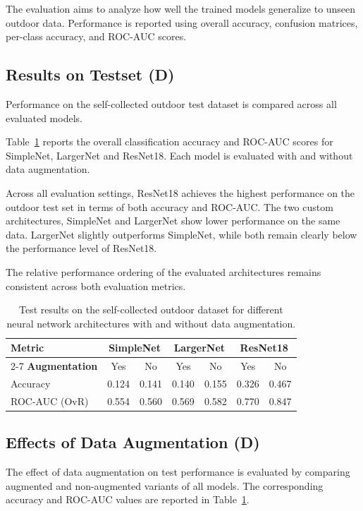 \documentclass[a4paper]{article}
\begin{document}
The evaluation aims to analyze how well the trained models generalize to unseen outdoor data. Performance is reported using overall accuracy, confusion matrices, per-class accuracy, and ROC-AUC scores.

\subsection{Results on Testset (D)}
Performance on the self-collected outdoor test dataset is compared across all evaluated models. 

Table~\ref{tab:test_results} reports the overall classification accuracy and ROC-AUC scores for SimpleNet, LargerNet and ResNet18. Each model is evaluated with and without data augmentation.

Across all evaluation settings, ResNet18 achieves the highest performance on the outdoor test set in terms of both accuracy and ROC-AUC. The two custom architectures, SimpleNet and LargerNet show lower performance on the same data. LargerNet slightly outperforms SimpleNet, while both remain clearly below the performance level of ResNet18. 

The relative performance ordering of the evaluated architectures remains consistent across both evaluation metrics.

\begin{table}[h]
\centering
\caption{Test results on the self-collected outdoor dataset for different neural network architectures with and without data augmentation.}
\label{tab:test_results}

\setlength{\tabcolsep}{8pt}
\renewcommand{\arraystretch}{1.15}

\begin{tabular}{lcccccc}
\hline
\textbf{Metric} & \multicolumn{2}{c}{\textbf{SimpleNet}} & \multicolumn{2}{c}{\textbf{LargerNet}} & \multicolumn{2}{c}{\textbf{ResNet18}} \\
\cline{2-7}
\textbf{Augmentation} & Yes & No & Yes & No & Yes & No \\
\hline
Accuracy      & 0.124 & 0.141 & 0.140 & 0.155 & 0.326 & 0.467 \\[2pt]
ROC-AUC (OvR) & 0.554 & 0.560 & 0.569 & 0.582 & 0.770 & 0.847 \\
\hline
\end{tabular}
\end{table}



\subsection{Effects of Data Augmentation (D)}
The effect of data augmentation on test performance is evaluated by comparing augmented and non-augmented variants of all models. The corresponding accuracy and ROC-AUC values are reported in Table~\ref{tab:test_results}.
\end{document}
